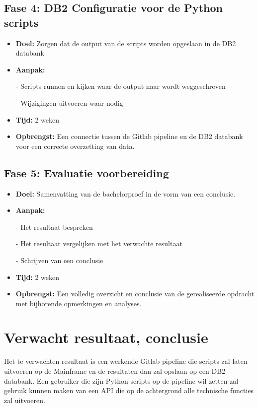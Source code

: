 \subsection{Fase 4: DB2 Configuratie voor de Python scripts}
\begin{itemize}
    \item \textbf{Doel:}
    Zorgen dat de output van de scripts worden opgeslaan in de DB2 databank
    \item \textbf{Aanpak:}
    \item[-] Scripts runnen en kijken waar de output naar wordt weggeschreven
    \item[-] Wijzigingen uitvoeren waar nodig
    
    \item \textbf{Tijd:} 2 weken
    \item \textbf{Opbrengst:}
    Een connectie tussen de Gitlab pipeline en de DB2 databank voor een correcte overzetting van data. 
\end{itemize}

\subsection{Fase 5: Evaluatie voorbereiding}
\begin{itemize}
    \item \textbf{Doel:}
    Samenvatting van de bachelorproef in de vorm van een conclusie.
    \item \textbf{Aanpak:}
    \item[-] Het resultaat bespreken
    \item[-] Het resultaat vergelijken met het verwachte resultaat
    \item[-] Schrijven van een conclusie
    
    \item \textbf{Tijd:} 2 weken
    \item \textbf{Opbrengst:}
    Een volledig overzicht en conclusie van de gerealiseerde opdracht met bijhorende opmerkingen en analyses. 
\end{itemize}


\section{Verwacht resultaat, conclusie}%
\label{sec:verwachte_resultaten}

Het te verwachten resultaat is een werkende Gitlab pipeline die scripts zal laten uitvoeren op de Mainframe en de resultaten dan zal opslaan op een DB2 databank. Een gebruiker die zijn Python scripts op de pipeline wil zetten zal gebruik kunnen maken van een API die op de achtergrond alle technische functies zal uitvoeren. 
